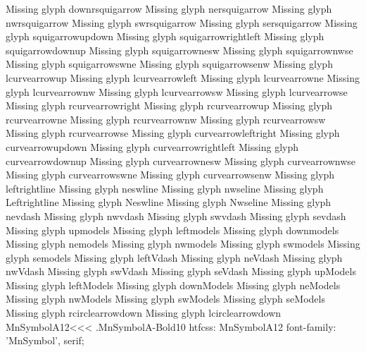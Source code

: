 Missing glyph	downrsquigarrow
Missing glyph	nersquigarrow
Missing glyph	nwrsquigarrow
Missing glyph	swrsquigarrow
Missing glyph	sersquigarrow
Missing glyph	squigarrowupdown
Missing glyph	squigarrowrightleft
Missing glyph	squigarrowdownup
Missing glyph	squigarrownesw
Missing glyph	squigarrownwse
Missing glyph	squigarrowswne
Missing glyph	squigarrowsenw
Missing glyph	lcurvearrowup
Missing glyph	lcurvearrowleft
Missing glyph	lcurvearrowne
Missing glyph	lcurvearrownw
Missing glyph	lcurvearrowsw
Missing glyph	lcurvearrowse
Missing glyph	rcurvearrowright
Missing glyph	rcurvearrowup
Missing glyph	rcurvearrowne
Missing glyph	rcurvearrownw
Missing glyph	rcurvearrowsw
Missing glyph	rcurvearrowse
Missing glyph	curvearrowleftright
Missing glyph	curvearrowupdown
Missing glyph	curvearrowrightleft
Missing glyph	curvearrowdownup
Missing glyph	curvearrownesw
Missing glyph	curvearrownwse
Missing glyph	curvearrowswne
Missing glyph	curvearrowsenw
Missing glyph	leftrightline
Missing glyph	neswline
Missing glyph	nwseline
Missing glyph	Leftrightline
Missing glyph	Neswline
Missing glyph	Nwseline
Missing glyph	nevdash
Missing glyph	nwvdash
Missing glyph	swvdash
Missing glyph	sevdash
Missing glyph	upmodels
Missing glyph	leftmodels
Missing glyph	downmodels
Missing glyph	nemodels
Missing glyph	nwmodels
Missing glyph	swmodels
Missing glyph	semodels
Missing glyph	leftVdash
Missing glyph	neVdash
Missing glyph	nwVdash
Missing glyph	swVdash
Missing glyph	seVdash
Missing glyph	upModels
Missing glyph	leftModels
Missing glyph	downModels
Missing glyph	neModels
Missing glyph	nwModels
Missing glyph	swModels
Missing glyph	seModels
Missing glyph	rcirclearrowdown
Missing glyph	lcirclearrowdown
\<MnSymbolA12\><<<
.MnSymbolA-Bold10
htfcss:  MnSymbolA12  font-family: 'MnSymbol', serif;


